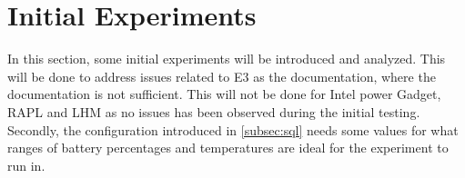 \section{Initial Experiments}\label{sec:initial_experiments}




In this section, some initial experiments will be introduced and analyzed. This will be done to address issues related to E3 as the documentation, where the documentation is not sufficient. This will not be done for Intel power Gadget, RAPL and LHM as no issues has been observed during the initial testing. Secondly, the configuration introduced in \cref{subsec:sql} needs some values for what ranges of battery percentages and temperatures are ideal for the experiment to run in.







% 

